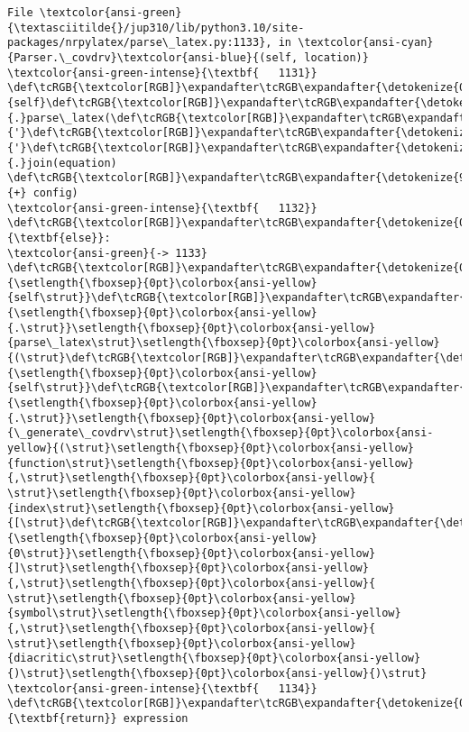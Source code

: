 \documentclass[landscape,letterpaper,10pt,english]{article}
\begin{document}
\begin{Verbatim}[commandchars=\\\{\}, frame=single, framerule=2mm, rulecolor=\color{outerrorbackground}]
File \textcolor{ansi-green}{\textasciitilde{}/jup310/lib/python3.10/site-packages/nrpylatex/parse\_latex.py:1133}, in \textcolor{ansi-cyan}{Parser.\_covdrv}\textcolor{ansi-blue}{(self, location)}
\textcolor{ansi-green-intense}{\textbf{   1131}}                 \def\tcRGB{\textcolor[RGB]}\expandafter\tcRGB\expandafter{\detokenize{0,135,0}}{self}\def\tcRGB{\textcolor[RGB]}\expandafter\tcRGB\expandafter{\detokenize{98,98,98}}{.}parse\_latex(\def\tcRGB{\textcolor[RGB]}\expandafter\tcRGB\expandafter{\detokenize{175,0,0}}{'}\def\tcRGB{\textcolor[RGB]}\expandafter\tcRGB\expandafter{\detokenize{175,0,0}}{'}\def\tcRGB{\textcolor[RGB]}\expandafter\tcRGB\expandafter{\detokenize{98,98,98}}{.}join(equation) \def\tcRGB{\textcolor[RGB]}\expandafter\tcRGB\expandafter{\detokenize{98,98,98}}{+} config)
\textcolor{ansi-green-intense}{\textbf{   1132}}             \def\tcRGB{\textcolor[RGB]}\expandafter\tcRGB\expandafter{\detokenize{0,135,0}}{\textbf{else}}:
\textcolor{ansi-green}{-> 1133}                 \def\tcRGB{\textcolor[RGB]}\expandafter\tcRGB\expandafter{\detokenize{0,135,0}}{\setlength{\fboxsep}{0pt}\colorbox{ansi-yellow}{self\strut}}\def\tcRGB{\textcolor[RGB]}\expandafter\tcRGB\expandafter{\detokenize{98,98,98}}{\setlength{\fboxsep}{0pt}\colorbox{ansi-yellow}{.\strut}}\setlength{\fboxsep}{0pt}\colorbox{ansi-yellow}{parse\_latex\strut}\setlength{\fboxsep}{0pt}\colorbox{ansi-yellow}{(\strut}\def\tcRGB{\textcolor[RGB]}\expandafter\tcRGB\expandafter{\detokenize{0,135,0}}{\setlength{\fboxsep}{0pt}\colorbox{ansi-yellow}{self\strut}}\def\tcRGB{\textcolor[RGB]}\expandafter\tcRGB\expandafter{\detokenize{98,98,98}}{\setlength{\fboxsep}{0pt}\colorbox{ansi-yellow}{.\strut}}\setlength{\fboxsep}{0pt}\colorbox{ansi-yellow}{\_generate\_covdrv\strut}\setlength{\fboxsep}{0pt}\colorbox{ansi-yellow}{(\strut}\setlength{\fboxsep}{0pt}\colorbox{ansi-yellow}{function\strut}\setlength{\fboxsep}{0pt}\colorbox{ansi-yellow}{,\strut}\setlength{\fboxsep}{0pt}\colorbox{ansi-yellow}{ \strut}\setlength{\fboxsep}{0pt}\colorbox{ansi-yellow}{index\strut}\setlength{\fboxsep}{0pt}\colorbox{ansi-yellow}{[\strut}\def\tcRGB{\textcolor[RGB]}\expandafter\tcRGB\expandafter{\detokenize{98,98,98}}{\setlength{\fboxsep}{0pt}\colorbox{ansi-yellow}{0\strut}}\setlength{\fboxsep}{0pt}\colorbox{ansi-yellow}{]\strut}\setlength{\fboxsep}{0pt}\colorbox{ansi-yellow}{,\strut}\setlength{\fboxsep}{0pt}\colorbox{ansi-yellow}{ \strut}\setlength{\fboxsep}{0pt}\colorbox{ansi-yellow}{symbol\strut}\setlength{\fboxsep}{0pt}\colorbox{ansi-yellow}{,\strut}\setlength{\fboxsep}{0pt}\colorbox{ansi-yellow}{ \strut}\setlength{\fboxsep}{0pt}\colorbox{ansi-yellow}{diacritic\strut}\setlength{\fboxsep}{0pt}\colorbox{ansi-yellow}{)\strut}\setlength{\fboxsep}{0pt}\colorbox{ansi-yellow}{)\strut}
\textcolor{ansi-green-intense}{\textbf{   1134}} \def\tcRGB{\textcolor[RGB]}\expandafter\tcRGB\expandafter{\detokenize{0,135,0}}{\textbf{return}} expression


\end{Verbatim}
\end{document}
